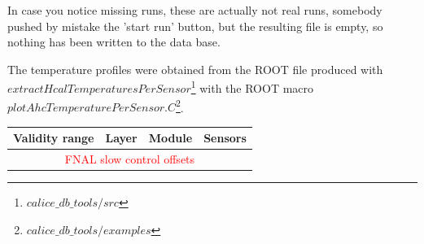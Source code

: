 \documentclass[a4paper,10pt]{article}
\begin{document}
 In case you notice missing runs, these are actually not real runs, somebody pushed by mistake the 'start run' button, but the resulting file is empty, so nothing has been written to the data base.

The temperature profiles were obtained from the ROOT file produced with\\ $extractHcalTemperaturesPerSensor$\footnote{$calice\_db\_tools/src$} with the ROOT macro $plotAhcTemperaturePerSensor.C$\footnote{$calice\_db\_tools/examples$}.

\begin{table}[h]
\begin{center}
\begin{tabular}{|c||c|c|c|}
\hline
 \textbf{Validity range} & \textbf{Layer}& \textbf{Module} & \textbf{Sensors} \\ \hline\hline
\multicolumn{4}{|c|}{\textcolor{red}{FNAL slow control offsets}}\\\hline


\end{tabular}
\end{center}
\end{table}
\end{document}
